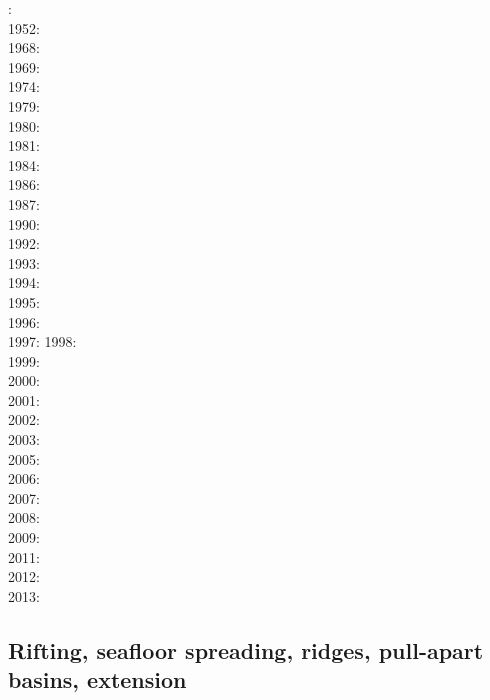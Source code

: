 : \cite{druc51}\cite{hafn51}\\
1952: \cite{drpr52}\\
1968: \cite{byer68}\\
1969: \cite{hand69}\\
1974: \cite{kogo74}\\
1979: \cite{goev79}\\
1980: \cite{brko80}\\
1981: \cite{delo81}\\
1984: \cite{rafi84}\cite{chpa84}\cite{vede84}\\
1986: \cite{kapf86}\\
1987: \cite{kikr87}\\
1990: \cite{wica90}\\
1992: \cite{bako92}\cite{chbo92}\cite{kali92}\cite{kohl92}\\
1993: \cite{kawu93}\\
1994: \cite{fran94}\\
1995: \cite{koem95}\cite{gltu95}\\
1996: \cite{wasd96}\cite{hiko96}\\
1997: \cite{eshe97a,eshe97b}
1998: \cite{copo98}\cite{mazk98}\\
1999: \cite{kayk99}\\
2000: \cite{rydr00}\cite{rana00}\cite{meko00a,meko00b}\\
2001: \cite{lova01}\\
2002: \cite{hirt02}\\
2003: \cite{hiko03}\cite{kaju03}\cite{mohi03}\\
2005: \cite{didr05}\cite{drur05}\\
2006: \cite{rygw06}\cite{buwa06}\\
2007: \cite{hirw07}\cite{kohl07}\cite{faja07}\\
2008: \cite{lemm08}\cite{budr08}\cite{koka08}\cite{gird08}\\
2009: \cite{kayk09}\cite{kako09}\\
2011: \cite{lell11}\cite{kemk11}\\
2012: \cite{reyn12}\\
2013: \cite{lepo13}\cite{miam13}


\subsection*{Rifting, seafloor spreading, ridges, pull-apart basins, extension}

